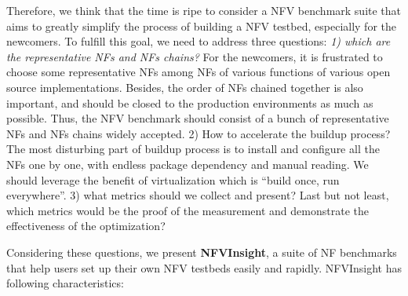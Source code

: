 Therefore, we think that the time is ripe to consider a NFV benchmark suite that aims to greatly simplify the process of building a NFV testbed, especially for the newcomers. To fulfill this goal, we need to address three questions:
\textit{1) which are the representative NFs and NFs chains?} For the newcomers, it is frustrated to choose some representative NFs among NFs of various functions of various open source implementations. Besides, the order of NFs chained together is also important, and should be closed to the production environments as much as possible. Thus, the NFV benchmark should consist of a bunch of representative NFs and NFs chains widely accepted.
2) How to accelerate the buildup process? The most disturbing part of buildup process is to install and configure all the NFs one by one, with endless package dependency and manual reading. We should leverage the benefit of virtualization which is ``build once, run everywhere''.
3) what metrics should we collect and present? Last but not least, which metrics would be the proof of the measurement and demonstrate the effectiveness of the optimization?

Considering these questions, we present \textbf{NFVInsight}, a suite of NF benchmarks that help users set up their own NFV testbeds easily and rapidly. NFVInsight has following characteristics:








